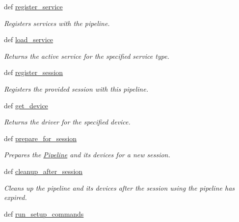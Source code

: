 \begin{DoxyCompactItemize}
def \hyperlink{classhwm_1_1hardware_1_1pipelines_1_1pipeline_1_1_pipeline_afd178f3378608228a03c0dfb01bc03a4}{register\-\_\-service}
\begin{DoxyCompactList}\small\item\em Registers services with the pipeline. \end{DoxyCompactList}\item 
def \hyperlink{classhwm_1_1hardware_1_1pipelines_1_1pipeline_1_1_pipeline_a899cc9766e24f78bbf0d33c582e65851}{load\-\_\-service}
\begin{DoxyCompactList}\small\item\em Returns the active service for the specified service type. \end{DoxyCompactList}\item 
def \hyperlink{classhwm_1_1hardware_1_1pipelines_1_1pipeline_1_1_pipeline_aa141e1e323f40181bf8e33f327ebaf9f}{register\-\_\-session}
\begin{DoxyCompactList}\small\item\em Registers the provided session with this pipeline. \end{DoxyCompactList}\item 
def \hyperlink{classhwm_1_1hardware_1_1pipelines_1_1pipeline_1_1_pipeline_ad26c38f4cebea0ce5e50ae9e7a0b0a2f}{get\-\_\-device}
\begin{DoxyCompactList}\small\item\em Returns the driver for the specified device. \end{DoxyCompactList}\item 
def \hyperlink{classhwm_1_1hardware_1_1pipelines_1_1pipeline_1_1_pipeline_ad14ea398b7972960acd534cf15fc92ba}{prepare\-\_\-for\-\_\-session}
\begin{DoxyCompactList}\small\item\em Prepares the \hyperlink{classhwm_1_1hardware_1_1pipelines_1_1pipeline_1_1_pipeline}{Pipeline} and its devices for a new session. \end{DoxyCompactList}\item 
def \hyperlink{classhwm_1_1hardware_1_1pipelines_1_1pipeline_1_1_pipeline_a6c632522905ca79a9e52ff9ca817bfa7}{cleanup\-\_\-after\-\_\-session}
\begin{DoxyCompactList}\small\item\em Cleans up the pipeline and its devices after the session using the pipeline has expired. \end{DoxyCompactList}\item 
def \hyperlink{classhwm_1_1hardware_1_1pipelines_1_1pipeline_1_1_pipeline_a8f72b62acd101f23f6f333b98869a9fd}{run\-\_\-setup\-\_\-commands}

\end{DoxyCompactItemize}
